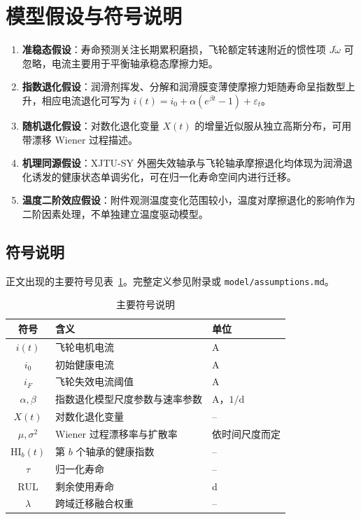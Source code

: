 \section{模型假设与符号说明}

\begin{enumerate}[label=\arabic*.]
    \item \textbf{准稳态假设}：寿命预测关注长期累积磨损，飞轮额定转速附近的惯性项 $J\dot\omega$ 可忽略，电流主要用于平衡轴承稳态摩擦力矩。
    \item \textbf{指数退化假设}：润滑剂挥发、分解和润滑膜变薄使摩擦力矩随寿命呈指数型上升，相应电流退化可写为 $i(t)=i_0+\alpha(e^{\beta t}-1)+\varepsilon_t$。
    \item \textbf{随机退化假设}：对数化退化变量 $X(t)$ 的增量近似服从独立高斯分布，可用带漂移 Wiener 过程描述。
    \item \textbf{机理同源假设}：XJTU-SY 外圈失效轴承与飞轮轴承摩擦退化均体现为润滑退化诱发的健康状态单调劣化，可在归一化寿命空间内进行迁移。
    \item \textbf{温度二阶效应假设}：附件观测温度变化范围较小，温度对摩擦退化的影响作为二阶因素处理，不单独建立温度驱动模型。
\end{enumerate}

\subsection{符号说明}

正文出现的主要符号见表~\ref{tab:symbols}。完整定义参见附录或 \texttt{model/assumptions.md}。

\begin{table}[H]
  \centering
  \caption{主要符号说明}
  \label{tab:symbols}
  \begin{tabular}{cll}
    \toprule
    符号 & 含义 & 单位 \\
    \midrule
    $i(t)$ & 飞轮电机电流 & A \\
    $i_0$ & 初始健康电流 & A \\
    $i_F$ & 飞轮失效电流阈值 & A \\
    $\alpha,\beta$ & 指数退化模型尺度参数与速率参数 & A，$1/\mathrm d$ \\
    $X(t)$ & 对数化退化变量 & -- \\
    $\mu,\sigma^2$ & Wiener 过程漂移率与扩散率 & 依时间尺度而定 \\
    $\mathrm{HI}_b(t)$ & 第 $b$ 个轴承的健康指数 & -- \\
    $\tau$ & 归一化寿命 & -- \\
    $\mathrm{RUL}$ & 剩余使用寿命 & d \\
    $\lambda$ & 跨域迁移融合权重 & -- \\
    \bottomrule
  \end{tabular}
\end{table}
